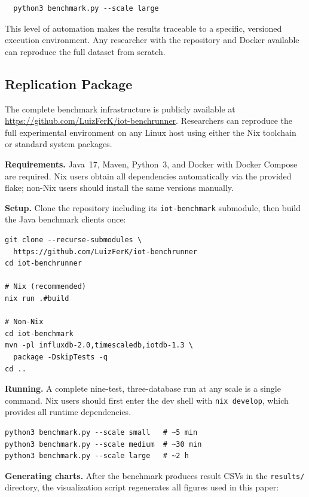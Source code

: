\begin{verbatim}
  python3 benchmark.py --scale large
\end{verbatim}

This level of automation makes the results traceable to a specific, versioned execution
environment. Any researcher with the repository and Docker available can reproduce the full
dataset from scratch.

\subsection{Replication Package}
\label{sec:replication}

The complete benchmark infrastructure is publicly available at
\url{https://github.com/LuizFerK/iot-benchrunner}. Researchers can
reproduce the full experimental environment on any Linux host using
either the Nix toolchain or standard system packages.

\textbf{Requirements.} Java~17, Maven, Python~3, and Docker with Docker
Compose are required. Nix users obtain all dependencies automatically via
the provided flake; non-Nix users should install the same versions
manually.

\textbf{Setup.} Clone the repository including its \texttt{iot-benchmark}
submodule, then build the Java benchmark clients once:

\begin{verbatim}
git clone --recurse-submodules \
  https://github.com/LuizFerK/iot-benchrunner
cd iot-benchrunner

# Nix (recommended)
nix run .#build

# Non-Nix
cd iot-benchmark
mvn -pl influxdb-2.0,timescaledb,iotdb-1.3 \
  package -DskipTests -q
cd ..
\end{verbatim}

\textbf{Running.} A complete nine-test, three-database run at any scale
is a single command. Nix users should first enter the dev shell with
\texttt{nix~develop}, which provides all runtime dependencies.

\begin{verbatim}
python3 benchmark.py --scale small   # ~5 min
python3 benchmark.py --scale medium  # ~30 min
python3 benchmark.py --scale large   # ~2 h
\end{verbatim}

\textbf{Generating charts.} After the benchmark produces result CSVs in
the \texttt{results/} directory, the visualization script regenerates all
figures used in this paper:

